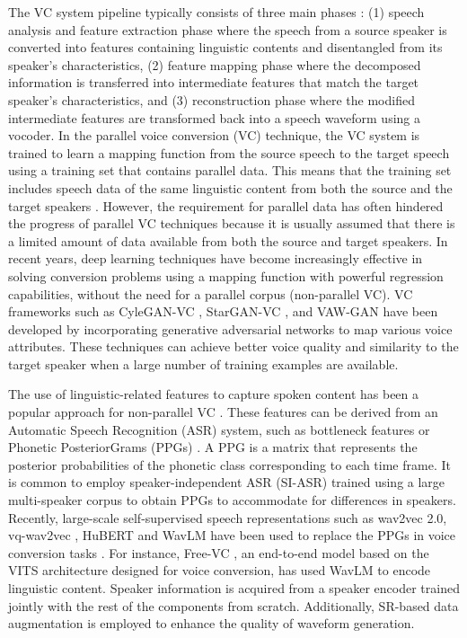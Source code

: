 The VC system pipeline typically consists of three main phases \cite{Sisman2020}: (1) speech analysis and feature extraction phase where the speech from a source speaker is converted into features containing linguistic contents and disentangled from its speaker's characteristics, (2) feature mapping phase where the decomposed information is transferred into intermediate features that match the target speaker's characteristics, and (3) reconstruction phase where the modified intermediate features are transformed back into a speech waveform using a vocoder.
In the parallel voice conversion (VC) technique, the VC system is trained to learn a mapping function from the source speech to the target speech using a training set that contains parallel data. This means that the training set includes speech data of the same linguistic content from both the source and the target speakers \cite{Sisman2020}. However, the requirement for parallel data has often hindered the progress of parallel VC techniques because it is usually assumed that there is a limited amount of data available from both the source and target speakers.  In recent years, deep learning techniques have become increasingly effective in solving conversion problems using a mapping function with powerful regression capabilities, without the need for a parallel corpus (non-parallel VC). VC frameworks such as CyleGAN-VC \cite{cycleganvc}, StarGAN-VC \cite{starganvc}, and VAW-GAN \cite{vawgan} have been developed by incorporating generative adversarial networks to map various voice attributes. These techniques can achieve better voice quality and similarity to the target speaker when a large number of training examples are available.

The use of linguistic-related features to capture spoken content has been a popular approach for non-parallel VC \cite{flytek2018, tian2019}. These features can be derived from an Automatic Speech Recognition (ASR) system, such as bottleneck features or Phonetic PosteriorGrams (PPGs) \cite{ppg2016}. A PPG is a matrix that represents the posterior probabilities of the phonetic class corresponding to each time frame. It is common to employ speaker-independent ASR (SI-ASR) trained using a large multi-speaker corpus to obtain PPGs to accommodate for differences in speakers. Recently, large-scale self-supervised speech representations such as wav2vec 2.0, vq-wav2vec \cite{baevski2019vq}, HuBERT and WavLM have been used to replace the PPGs in voice conversion tasks \cite{polyak2021, huang2022, li2023freevc}. For instance, Free-VC \cite{li2023freevc}, an end-to-end model based on the VITS architecture designed for voice conversion, has used WavLM to encode linguistic content. Speaker information is acquired from a speaker encoder trained jointly with the rest of the components from scratch. Additionally, SR-based data augmentation is employed to enhance the quality of waveform generation.

